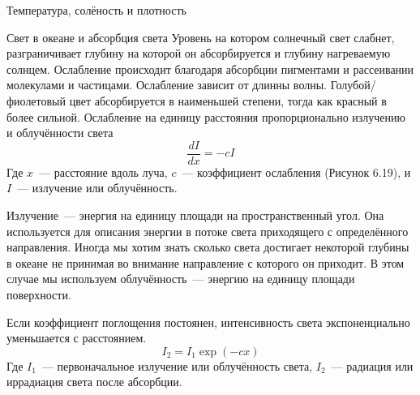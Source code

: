 \begin{chapter}{Температура, солёность и плотность}
\begin{section}{Свет в океане и абсорбция света}
Уровень на котором солнечный свет слабнет, разграничивает глубину на
которой он абсорбируется и глубину нагреваемую солнцем. Ослабление
происходит благодаря абсорбции пигментами и рассеивании молекулами и
частицами. Ослабление зависит от длинны волны. Голубой/фиолетовый цвет
абсорбируется в наименьшей степени, тогда как красный в более
сильной. Ослабление на единицу расстояния пропорционально излучению и
облучённости света
\begin{equation}
\frac{dI}{dx} = -c I
\end{equation}
Где $x$~--- расстояние вдоль луча, $c$~--- коэффициент ослабления
(Рисунок 6.19), и $I$~--- излучение или облучённость.
%


Излучение~--- энергия на единицу площади на пространственный
угол. Она используется для описания энергии в потоке света приходящего
с определённого направления. Иногда мы хотим знать сколько света
достигает некоторой глубины в океане не принимая во внимание
направление с которого он приходит. В этом случае мы используем
облучённость~--- энергию на единицу площади поверхности.
%

Если коэффициент поглощения постоянен, интенсивность света
экспоненциально уменьшается с расстоянием.
\begin{equation}
I_2 = I_1 \exp(-cx)
\end{equation}
Где $I_1$~--- первоначальное излучение или облучённость света,
$I_2$~--- радиация или иррадиация света после абсорбции.
%


\end{section}
\end{chapter}
